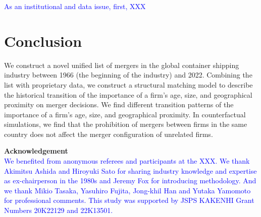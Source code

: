 \documentclass[10pt]{article}
\begin{document}
\textcolor{blue}{As an institutional and data issue, first, XXX}



\section{Conclusion}\label{sec:conclusion}
We construct a novel unified list of mergers in the global container shipping industry between 1966 (the beginning of the industry) and 2022. 
Combining the list with proprietary data, we construct a structural matching model \citep{fox2018qe} to describe the historical transition of the importance of a firm's age, size, and geographical proximity on merger decisions. 
We find different transition patterns of the importance of a firm's age, size, and geographical proximity.
In counterfactual simulations, we find that the prohibition of mergers between firms in the same country does not affect the merger configuration of unrelated firms.

\textbf{Acknowledgement} \\
\textcolor{blue}{We benefited from anonymous referees and participants at the XXX. We thank Akimitsu Ashida and Hiroyuki Sato for sharing industry knowledge and expertise as ex-chairperson in the 1980s and Jeremy Fox for introducing methodology. And we thank Mikio Tasaka, Yasuhiro Fujita, Jong-khil Han and Yutaka Yamomoto for professional comments. This study was supported by JSPS KAKENHI Grant Numbers 20K22129 and 22K13501. }





\end{document}
